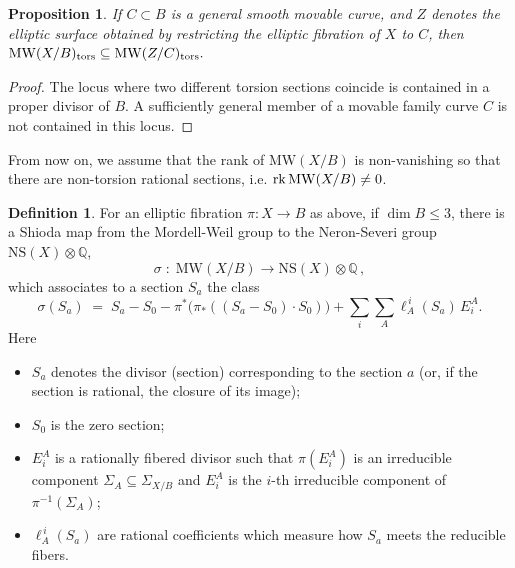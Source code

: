 \documentclass[11pt]{amsart}
\newtheorem{proposition}[theorem]{Proposition}
\theoremstyle{definition}
\newtheorem{definition}[theorem]{Definition}
\theoremstyle{definition}
\theoremstyle{remark}
\theoremstyle{remark}
\theoremstyle{definition}
\theoremstyle{conjecture}
\newcommand{\NS}{\mathrm{NS}}
\newcommand{\MW}{\mathrm{MW}}
\begin{document}
  
 \begin{proposition}\label{prop:MWtorinj} If  $C \subset B$ is a  general smooth movable curve, 
 {and $Z$ denotes the elliptic surface obtained by restricting the elliptic fibration of $X$ to $C$,}
then
 $\MW(X/B)_{\rm tors} \subseteq \MW(Z/C)_{\rm tors} .$
\end{proposition}
\begin{proof} The locus where two different torsion sections coincide is contained in a proper divisor of $B$. A  sufficiently general member of a movable family curve $C$ is not contained in this locus. \end{proof}
\color{black}

 From now on,  we assume that the rank of $\MW(X/B)$ is non-vanishing  so that  there are non-torsion rational sections, i.e.
 ${\rm rk}\,  \MW(X/B) \not=0$.



  
 

 



\begin{definition} \label{def:shioda}\cite{Shioda1990, Morrison:2012ei}
  For an elliptic fibration $\pi:X\to B$
as above, if $\dim B \leq 3$, there is a Shioda map from the Mordell-Weil group to the Neron-Severi group $\NS(X)\otimes\mathbb{Q}$,
  \[
    \sigma \;:\; \MW(X/B)\longrightarrow \NS(X)\otimes\mathbb{Q} \,,
  \]
  which associates to a section $S_a$ the class
  \begin{equation}\label{eq:shioda-general}
    \sigma(S_a) \;=\; S_a - S_0
    - \pi^*\!\bigl(\pi_*( (S_a - S_0)\cdot S_0 )\bigr)
    + \sum_{i}\sum_{A} \ell^{\,i}_A(S_a)\,E_i^{A}.
  \end{equation}
Here
  \begin{itemize}
    \item $S_a$ denotes the divisor (section) corresponding to the section  $a$  (or,  if the section is rational, the closure of its image);
    \item $S_0$ is the zero section;
    \item $E_i^{A}$ is a rationally fibered divisor  such that $\pi(E_i^A) $  is an irreducible component $\Sigma_A \subseteq\Sigma_{X/B}$ and $E_i^A$ is the $i$-th irreducible component of  $\pi^{-1}(\Sigma_A)$;
     \item $\ell^{\,i}_A(S_a)$ are rational coefficients which measure how $S_a$ meets the reducible fibers.
  \end{itemize}
\end{definition}
\end{document}
